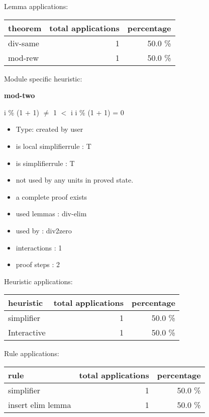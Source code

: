 \documentclass[a4paper]{article}
\begin{document}
Lemma applications:

\begin{supertabular}{l|r|r}
theorem	        & total applications & percentage \\ \hline
div-same & 1 & 50.0 \% \\
mod-rew & 1 & 50.0 \% \\

\end{supertabular}

Module specific heuristic:

\pagebreak

{\LARGE\bf mod-two}\label{lemma-mod-two}

\medskip

 \Fol i \% (1 + 1) $\neq$ 1  $<$ i \Imp i \% (1 + 1) = 0

\begin{itemize}

\item Type: created by user

\item is local simplifierrule : T
\item is simplifierrule : T
\item not used by any units in proved state.
\item       a complete proof exists
\item       used lemmas  : div-elim
\item       used by      : div2zero
\item       interactions : 1
\item       proof steps  : 2
\end{itemize}

\medskip


Heuristic applications:

\begin{supertabular}{l|r|r}
heuristic	& total applications & percentage \\ \hline
simplifier & 1 & 50.0 \% \\
Interactive & 1 & 50.0 \% \\

\end{supertabular}

Rule applications:

\begin{supertabular}{l|r|r}
rule	        & total applications & percentage \\ \hline
simplifier & 1 & 50.0 \% \\
insert elim lemma & 1 & 50.0 \% \\

\end{supertabular}
\end{document}
